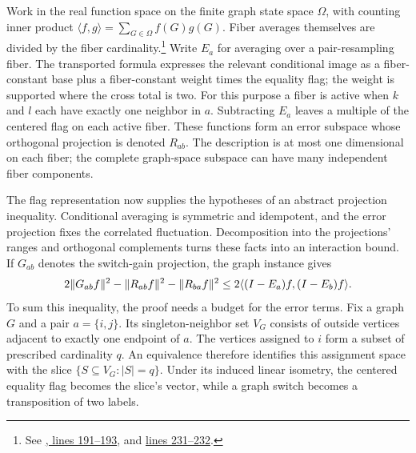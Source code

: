 Work in the real function space on the finite graph state space $\Omega$,
with counting inner product $\langle f,g\rangle=\sum_{G\in\Omega}f(G)g(G)$.
Fiber averages themselves are divided by the fiber cardinality.\footnote{See
\href{https://github.com/openai/math/blob/fd4aeeb2ee4fc729c18d98444fed42fd0529eeeb/lean/OAI/Probability/SwitchChain/OrthogonalPairResampling.lean\#L191-L193}{, lines 191--193}, and
\href{https://github.com/openai/math/blob/fd4aeeb2ee4fc729c18d98444fed42fd0529eeeb/lean/OAI/Probability/SwitchChain/OrthogonalPairResampling.lean\#L231-L232}{lines 231--232}.}
Write $E_a$ for averaging over a
pair-resampling fiber. The transported formula expresses the relevant conditional image as a fiber-constant base plus a fiber-constant weight times the equality flag; the weight is supported where the cross total is two. For this purpose a fiber is active when $k$ and $l$ each have exactly one neighbor in $a$. Subtracting $E_a$ leaves a multiple of the centered flag on each active fiber. These functions form an error subspace whose orthogonal projection is denoted $R_{ab}$. The description is at most one dimensional on each fiber; the complete graph-space subspace can have many independent fiber components.

The flag representation now supplies the hypotheses of an abstract
projection inequality. Conditional averaging is symmetric and idempotent,
and the error projection fixes the correlated fluctuation. Decomposition
into the projections' ranges and orthogonal complements turns these facts
into an interaction bound. If $G_{ab}$ denotes the switch-gain projection,
the graph instance gives
\[
 2\lVert G_{ab}f\rVert^2-\lVert R_{ab}f\rVert^2-\lVert R_{ba}f\rVert^2
 \leq2\langle(I-E_a)f,(I-E_b)f\rangle.
\]
To sum this inequality, the proof needs a budget for the error terms.
Fix a graph
$G$ and a pair $a=\{i,j\}$. Its singleton-neighbor set $V_G$ consists of
outside vertices adjacent to exactly one endpoint of $a$. The vertices
assigned to $i$ form a subset of prescribed cardinality $q$. An equivalence
therefore identifies this assignment space with the slice
$\{S\subseteq V_G:|S|=q\}$. Under its induced linear isometry, the
centered equality flag becomes the slice's  vector, while a
graph switch becomes a transposition of two labels.

